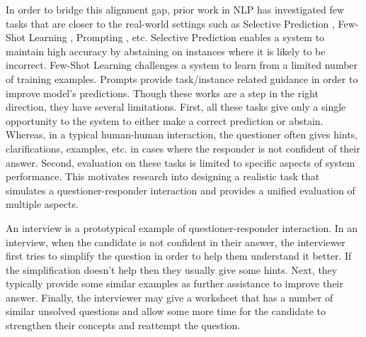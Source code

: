 \documentclass[11pt,a4paper]{article}
\newcommand{\Neeraj}[1]{{\small \color{red} [Neeraj: #1]}}
\begin{document}
In order to bridge this alignment gap, prior work in NLP has investigated few tasks that are closer to the real-world settings such as Selective Prediction \cite{kamath-etal-2020-selective,jones2020selective,varshney2020s}, Few-Shot Learning \cite{NEURIPS2020_1457c0d6, schick-schutze-2021-just, Ye2021CrossFitAF, Tam2021ImprovingAS}, Prompting \cite{shin-etal-2020-autoprompt,jiang-etal-2020-know,le-scao-rush-2021-many, Mishra2021NaturalIB}, etc.
Selective Prediction enables a system to maintain high accuracy by abstaining on instances where it is likely to be incorrect.
Few-Shot Learning challenges a system to learn from a limited number of training examples.
Prompts provide task/instance related guidance in order to improve model's predictions.
Though these works are a step in the right direction, they have several limitations. 
First, all these tasks give only a single opportunity to the system to either make a correct prediction or abstain. Whereas, in a typical human-human interaction, the questioner often gives hints, clarifications, examples, etc. in cases where the responder is not confident of their answer. 
Second, evaluation on these tasks is limited to specific aspects of system performance.
This motivates research into designing a realistic task that simulates a questioner-responder interaction and provides a unified evaluation of multiple aspects.

An interview is a prototypical example of questioner-responder interaction.
In an interview, when the candidate is not confident in their answer, the interviewer first tries to simplify the question in order to help them understand it better.
If the simplification doesn't help then they usually give some hints.
Next, they typically provide some similar examples as further assistance to improve their answer.
Finally, the interviewer may give a worksheet that has a number of similar unsolved questions and allow some more time for the candidate to strengthen their concepts and reattempt the question.
\end{document}
